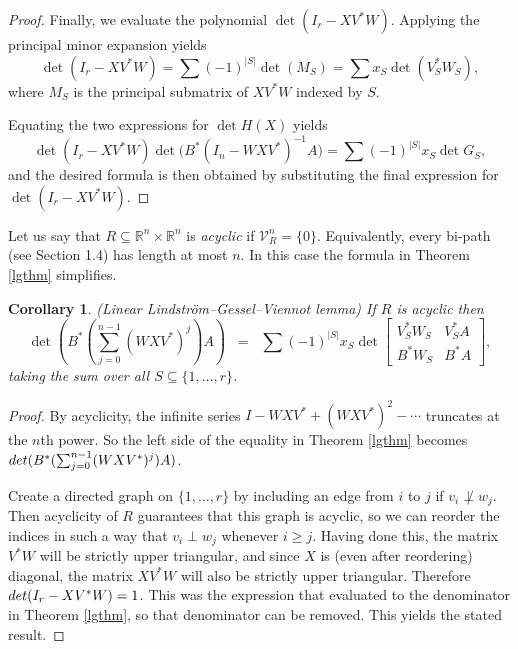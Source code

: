 \documentclass[10pt,a4paper]{amsart}
\newtheorem{cor}[thm]{Corollary}
\begin{document}
\begin{proof}
Finally, we evaluate the polynomial $\det(I_r - X V^* W)$. Applying the principal minor expansion yields $$\det(I_r - X V^* W) = \sum (-1)^{|S|} \det(M_S) = \sum x_S \det(V_S^* W_S),$$ where $M_S$ is the principal submatrix of $X V^* W$ indexed by $S$.

Equating the two expressions for $\det H(X)$ yields $$ \det(I_r - X V^* W) \det\Big( B^* (I_n - W X V^*)^{-1} A \Big) = \sum (-1)^{|S|} x_S \det G_S,$$ and the desired formula is then obtained by substituting the final expression for $\det(I_r - X V^* W)$.
\end{proof}

Let us say that $R \subseteq \mathbb{R}^n \times \mathbb{R}^n$ is {\it acyclic} if $\mathcal{V}_R^n = \{0\}$. Equivalently, every bi-path (see Section 1.4) has length at most $n$. In this case the formula in Theorem \ref{lgthm} simplifies.

\begin{cor}\label{lgcor} (Linear Lindström–Gessel–Viennot lemma)
If $R$ is acyclic then $$ \det \left( B^* \left( \sum_{j=0}^{n-1} (W X V^*)^j \right) A \right) \;\;=\;\; \sum (-1)^{|S|} x_S \det \left[\begin{matrix} V_S^* W_S & V_S^* A \\ B^* W_S & B^* A \end{matrix}\right],$$ taking the sum over all $S \subseteq \{1, \ldots, r\}$.
\end{cor}

\begin{proof}
By acyclicity, the infinite series $I -  WXV^* + (WXV^*)^2 - \cdots$ truncates at the $n$th power. So the left side of the equality in Theorem \ref{lgthm} becomes ${\rm det}(B^*(\sum_{j=0}^{n-1} (WXV^*)^j)A)$.

Create a directed graph on $\{1, \ldots, r\}$ by including an edge from $i$ to $j$ if $v_i \not\perp w_j$. Then acyclicity of $R$ guarantees that this graph is acyclic, so we can reorder the indices in such a way that $v_i \perp w_j$ whenever $i \geq j$. Having done this, the matrix $V^*W$ will be strictly upper triangular, and since $X$ is (even after reordering) diagonal, the matrix $XV^*W$ will also be strictly upper triangular. Therefore ${\rm det}(I_r - XV^*W) = 1$. This was the expression that evaluated to the denominator in Theorem \ref{lgthm}, so that denominator can be removed. This yields the stated result.
\end{proof}
\end{document}
